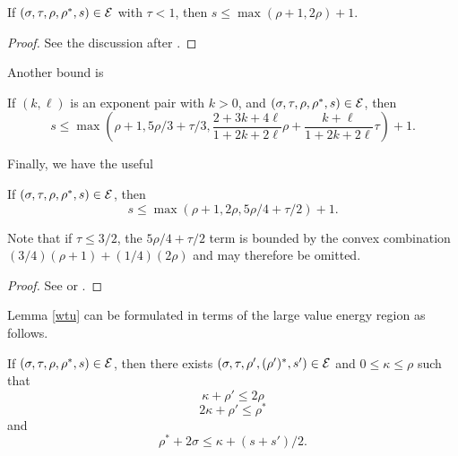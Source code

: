 \begin{lemma}\label{easy-double-zeta-bound}  If $(\sigma,\tau,\rho,\rho^*,s) \in \mathcal{E}$ with $\tau < 1$, then $s \leq \max(\rho+1, 2\rho)+1$.
\end{lemma}

\begin{proof} See the discussion after \cite[(11.63)]{ivic}.
\end{proof}

Another bound is

\begin{lemma}\label{double-zeta_from_exp_pair}\cite[Lemma 11.2]{ivic}  If $(k,\ell)$ is an exponent pair with $k>0$, and $(\sigma,\tau,\rho,\rho^*,s) \in \mathcal{E}$, then
$$ s \leq \max\left( \rho+1, 5\rho/3 + \tau/3, \frac{2+3k+4\ell}{1+2k+2\ell} \rho + \frac{k+\ell}{1+2k+2\ell} \tau\right) + 1.$$
\end{lemma}


Finally, we have the useful

\begin{lemma}\label{hb-double}  If $(\sigma,\tau,\rho,\rho^*,s) \in \mathcal{E}$, then
    $$ s \leq \max( \rho+1, 2\rho, 5\rho/4+\tau/2) + 1.$$
\end{lemma}

Note that if $\tau \leq 3/2$, the $5\rho/4+\tau/2$ term is bounded by the convex combination $(3/4)(\rho+1)+(1/4)(2\rho)$ and may therefore be omitted.

\literature
{}

\begin{proof} See \cite[Theorem 1]{heathbrown_large_1979} or \cite[Lemma 11.5]{ivic}.
\end{proof}

Lemma \ref{wtu} can be formulated in terms of the large value energy region as follows.

\begin{lemma}\label{wtu-alt}  If $(\sigma,\tau,\rho,\rho^*,s) \in \mathcal{E}$, then there exists $(\sigma,\tau,\rho',(\rho')^*,s') \in \mathcal{E}$ and $0 \leq \kappa \leq \rho$ such that
$$ \kappa + \rho' \leq 2 \rho$$
$$ 2\kappa + \rho' \leq \rho^*$$
and
$$ \rho^* + 2\sigma \leq \kappa + (s+s')/2.$$
\end{lemma}


